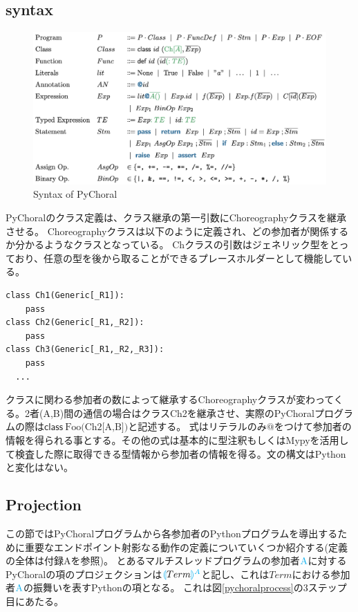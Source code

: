 \documentclass{thesis}
\newcommand{\projection}[2]{{\color{cyan}\llparenthesis}#1{\color{cyan}\rrparenthesis^#2}}
\newcommand{\cyan}[1]{\color{cyan}#1}
\begin{document}
\subsection{syntax}
\begin{figure}[H]
  \centering
  \includegraphics[scale=0.75]{image/syntax.png}
  \caption{Syntax of PyChoral}
  \label{syntax}
\end{figure}

PyChoralのクラス定義は、クラス継承の第一引数にChoreographyクラスを継承させる。
Choreographyクラスは以下のように定義され、どの参加者が関係するか分かるようなクラスとなっている。
Chクラスの引数はジェネリック型をとっており、任意の型を後から取ることができるプレースホルダーとして機能している。
\begin{lstlisting}[caption=Choreographyクラス,label=ch]
class Ch1(Generic[_R1]):
    pass
class Ch2(Generic[_R1,_R2]):
    pass
class Ch3(Generic[_R1,_R2,_R3]):
    pass
  ... 
\end{lstlisting}
クラスに関わる参加者の数によって継承するChoreographyクラスが変わってくる。2者(A,B)間の通信の場合はクラスCh2を継承させ、実際のPyChoralプログラムの際は$\textsf{class}~\text{Foo(Ch2[A,B])}$と記述する。
式はリテラルのみ$@$をつけて参加者の情報を得られる事とする。その他の式は基本的に型注釈もしくはMypyを活用して検査した際に取得できる型情報から参加者の情報を得る。文の構文はPythonと変化はない。


\subsection{Projection}
この節ではPyChoralプログラムから各参加者のPythonプログラムを導出するために重要なエンドポイント射影なる動作の定義についていくつか紹介する(定義の全体は付録Aを参照)。
とあるマルチスレッドプログラムの参加者$\cyan{\text{A}}$に対するPyChoralの項のプロジェクションは$\projection{Term}{A}$と記し、これは$Term$における参加者$\cyan{\text{A}}$の振舞いを表すPythonの項となる。
これは図\ref{pychoralprocess}の3ステップ目にあたる。
\end{document}
